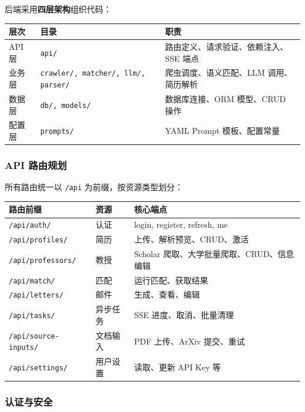 \documentclass[11pt]{article}
\begin{document}
后端采用\textbf{四层架构}组织代码：

\begin{center}
\small
\begin{tabular}{|l|p{4.5cm}|p{4cm}|}
\hline
\textbf{层次} & \textbf{目录} & \textbf{职责} \\
\hline
API 层 & \texttt{api/} & 路由定义、请求验证、依赖注入、SSE 端点 \\
\hline
业务层 & \texttt{crawler/, matcher/, llm/, parser/} & 爬虫调度、语义匹配、LLM 调用、简历解析 \\
\hline
数据层 & \texttt{db/, models/} & 数据库连接、ORM 模型、CRUD 操作 \\
\hline
配置层 & \texttt{prompts/} & YAML Prompt 模板、配置常量 \\
\hline
\end{tabular}
\end{center}

\subsubsection{API 路由规划}

所有路由统一以 \texttt{/api} 为前缀，按资源类型划分：

\begin{center}
\begin{tabular}{|l|l|l|}
\hline
\textbf{路由前缀} & \textbf{资源} & \textbf{核心端点} \\
\hline
\texttt{/api/auth/} & 认证 & login, register, refresh, me \\
\texttt{/api/profiles/} & 简历 & 上传、解析预览、CRUD、激活 \\
\texttt{/api/professors/} & 教授 & Scholar 爬取、大学批量爬取、CRUD、信息编辑 \\
\texttt{/api/match/} & 匹配 & 运行匹配、获取结果 \\
\texttt{/api/letters/} & 邮件 & 生成、查看、编辑 \\
\texttt{/api/tasks/} & 异步任务 & SSE 进度、取消、批量清理 \\
\texttt{/api/source-inputs/} & 文档输入 & PDF 上传、ArXiv 提交、重试 \\
\texttt{/api/settings/} & 用户设置 & 读取、更新 API Key 等 \\
\hline
\end{tabular}
\end{center}

\subsubsection{认证与安全}
\end{document}
